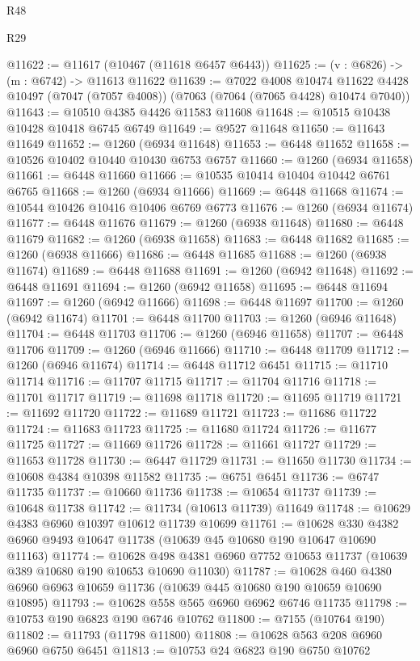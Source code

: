 \begin{lexlean}{R48}
\begin{lexlean}{R29}
\begin{coremodule}
{{{{{{{{{{{{{{{{{{{{{{{{{{{{{{{{{{{{{{{{{{{{{{{{{{{{{{{{{{{{{{{{{{{{{{{{{{{{{{{{{{{{{{{{{{{{{{{{{{{{{{{{{{{{{{{{{{{{{{{{{{{{{{{{{{{{{{{{{{{{{{{{{{{{{{{{{{{{{{{{{{{{{{{{{{{{{{{{{{{{{{{{{{{{{{{{{{{{{{{{{{{{{{{{{{{{{{{{{{@11622 := @11617 (@10467 (@11618 @6457 @6443))
@11625 := (v : @6826) -> (m : @6742) -> @11613 @11622
@11639 := @7022
    @4008
    @10474
    @11622
    @4428
    @10497
    (@7047 (@7057 @4008))
    (@7063 (@7064 (@7065 @4428) @10474 @7040))
@11643 := @10510 @4385 @4426 @11583 @11608
@11648 := @10515 @10438 @10428 @10418 @6745 @6749
@11649 := @9527 @11648
@11650 := @11643 @11649
@11652 := @1260 (@6934 @11648)
@11653 := @6448 @11652
@11658 := @10526 @10402 @10440 @10430 @6753 @6757
@11660 := @1260 (@6934 @11658)
@11661 := @6448 @11660
@11666 := @10535 @10414 @10404 @10442 @6761 @6765
@11668 := @1260 (@6934 @11666)
@11669 := @6448 @11668
@11674 := @10544 @10426 @10416 @10406 @6769 @6773
@11676 := @1260 (@6934 @11674)
@11677 := @6448 @11676
@11679 := @1260 (@6938 @11648)
@11680 := @6448 @11679
@11682 := @1260 (@6938 @11658)
@11683 := @6448 @11682
@11685 := @1260 (@6938 @11666)
@11686 := @6448 @11685
@11688 := @1260 (@6938 @11674)
@11689 := @6448 @11688
@11691 := @1260 (@6942 @11648)
@11692 := @6448 @11691
@11694 := @1260 (@6942 @11658)
@11695 := @6448 @11694
@11697 := @1260 (@6942 @11666)
@11698 := @6448 @11697
@11700 := @1260 (@6942 @11674)
@11701 := @6448 @11700
@11703 := @1260 (@6946 @11648)
@11704 := @6448 @11703
@11706 := @1260 (@6946 @11658)
@11707 := @6448 @11706
@11709 := @1260 (@6946 @11666)
@11710 := @6448 @11709
@11712 := @1260 (@6946 @11674)
@11714 := @6448 @11712 @6451
@11715 := @11710 @11714
@11716 := @11707 @11715
@11717 := @11704 @11716
@11718 := @11701 @11717
@11719 := @11698 @11718
@11720 := @11695 @11719
@11721 := @11692 @11720
@11722 := @11689 @11721
@11723 := @11686 @11722
@11724 := @11683 @11723
@11725 := @11680 @11724
@11726 := @11677 @11725
@11727 := @11669 @11726
@11728 := @11661 @11727
@11729 := @11653 @11728
@11730 := @6447 @11729
@11731 := @11650 @11730
@11734 := @10608 @4384 @10398 @11582
@11735 := @6751 @6451
@11736 := @6747 @11735
@11737 := @10660 @11736
@11738 := @10654 @11737
@11739 := @10648 @11738
@11742 := @11734 (@10613 @11739) @11649
@11748 := @10629 @4383 @6960 @10397 @10612 @11739 @10699
@11761 := @10628 @330 @4382 @6960 @9493 @10647 @11738 (@10639 @45 @10680 @190 @10647 @10690 @11163)
@11774 := @10628 @498 @4381 @6960 @7752 @10653 @11737 (@10639 @389 @10680 @190 @10653 @10690 @11030)
@11787 := @10628 @460 @4380 @6960 @6963 @10659 @11736 (@10639 @445 @10680 @190 @10659 @10690 @10895)
@11793 := @10628 @558 @565 @6960 @6962 @6746 @11735
@11798 := @10753 @190 @6823 @190 @6746 @10762
@11800 := @7155 (@10764 @190)
@11802 := @11793 (@11798 @11800)
@11808 := @10628 @563 @208 @6960 @6960 @6750 @6451
@11813 := @10753 @24 @6823 @190 @6750 @10762
}}}}}}}}}}}}}}}}}}}}}}}}}}}}}}}}}}}}}}}}}}}}}}}}}}}}}}}}}}}}}}}}}}}}}}}}}}}}}}}}}}}}}}}}}}}}}}}}}}}}}}}}}}}}}}}}}}}}}}}}}}}}}}}}}}}}}}}}}}}}}}}}}}}}}}}}}}}}}}}}}}}}}}}}}}}}}}}}}}}}}}}}}}}}}}}}}}}}}}}}}}}}}}}}}}}}}}}}}}
\end{coremodule}
\end{lexlean}
\end{lexlean}
